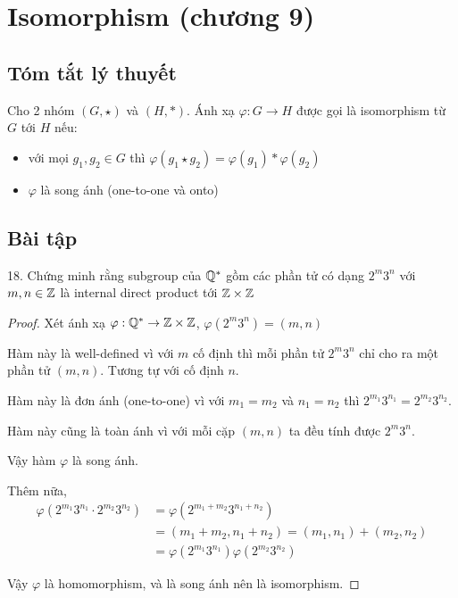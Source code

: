 \section{Isomorphism (chương 9)}

\subsection{Tóm tắt lý thuyết}

Cho 2 nhóm $(G, \star)$ và $(H, *)$. Ánh xạ $\varphi: G \rightarrow H$ được gọi là isomorphism từ $G$ tới $H$ nếu:

\begin{itemize}
    \item với mọi $g_1, g_2 \in G$ thì $\varphi(g_1 \star g_2) = \varphi(g_1) * \varphi(g_2)$
    \item $\varphi$ là song ánh (one-to-one và onto)
\end{itemize}

\subsection{Bài tập}

18. Chứng minh rằng subgroup của $\mathbb{Q}^*$ gồm các phần tử có dạng $2^m 3^n$ với $m, n \in \mathbb{Z}$ là internal direct product tới $\mathbb{Z} \times \mathbb{Z}$

\begin{proof}
    Xét ánh xạ $\varphi: \mathbb{Q}^* \rightarrow \mathbb{Z} \times \mathbb{Z}$, $\varphi(2^m 3^n) = (m, n)$

    Hàm này là well-defined vì với $m$ cố định thì mỗi phần tử $2^m 3^n$ chỉ cho ra một phần tử $(m, n)$. Tương tự với cố định $n$.

    Hàm này là đơn ánh (one-to-one) vì với $m_1 = m_2$ và $n_1 = n_2$ thì $2^{m_1} 3^{n_1} = 2^{m_2} 3^{n_2}$.

    Hàm này cũng là toàn ánh vì với mỗi cặp $(m, n)$ ta đều tính được $2^m 3^n$.

    Vậy hàm $\varphi$ là song ánh.

    Thêm nữa, 
    \begin{align*}
        \varphi(2^{m_1} 3^{n_1} \cdot 2^{m_2} 3^{n_2})& = \varphi(2^{m_1 + m_2} 3^{n_1 + n_2}) \\
        & = (m_1 + m_2, n_1 + n_2) = (m_1, n_1) + (m_2, n_2) \\
        & = \varphi(2^{m_1} 3^{n_1}) \varphi(2^{m_2} 3^{n_2})
    \end{align*}

    Vậy $\varphi$ là homomorphism, và là song ánh nên là isomorphism.

    \end{proof}

